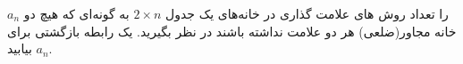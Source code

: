 \EXERCISE
$a_n$
 را تعداد روش های علامت گذاری در خانه‌های یک جدول
$2 \times n$
به گونه‌ای که هیچ دو خانه مجاور(ضلعی) هر دو علامت نداشته باشند در نظر بگیرید. یک رابطه بازگشتی برای
$a_n$
بیابید.